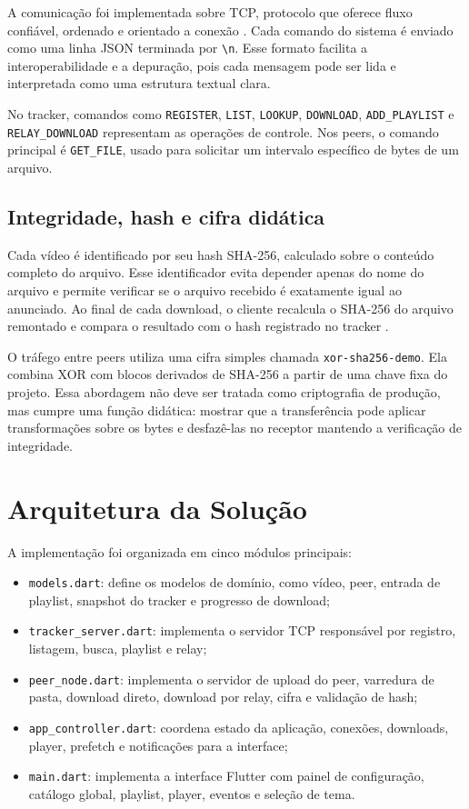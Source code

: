\documentclass[
	12pt,
	oneside,
	a4paper,
	chapter=TITLE,
	section=TITLE,
	english,
	brazilian,
	sumario=tradicional
]{abntex2}
\begin{document}
A comunicação foi implementada sobre TCP, protocolo que oferece fluxo confiável, ordenado e orientado a conexão \cite{rfc9293}. Cada comando do sistema é enviado como uma linha JSON terminada por \texttt{\textbackslash n}. Esse formato facilita a interoperabilidade e a depuração, pois cada mensagem pode ser lida e interpretada como uma estrutura textual clara.

No tracker, comandos como \texttt{REGISTER}, \texttt{LIST}, \texttt{LOOKUP}, \texttt{DOWNLOAD}, \texttt{ADD\_PLAYLIST} e \texttt{RELAY\_DOWNLOAD} representam as operações de controle. Nos peers, o comando principal é \texttt{GET\_FILE}, usado para solicitar um intervalo específico de bytes de um arquivo.

\subsection{Integridade, hash e cifra didática}

Cada vídeo é identificado por seu hash SHA-256, calculado sobre o conteúdo completo do arquivo. Esse identificador evita depender apenas do nome do arquivo e permite verificar se o arquivo recebido é exatamente igual ao anunciado. Ao final de cada download, o cliente recalcula o SHA-256 do arquivo remontado e compara o resultado com o hash registrado no tracker \cite{nist2015sha}.

O tráfego entre peers utiliza uma cifra simples chamada \texttt{xor-sha256-demo}. Ela combina XOR com blocos derivados de SHA-256 a partir de uma chave fixa do projeto. Essa abordagem não deve ser tratada como criptografia de produção, mas cumpre uma função didática: mostrar que a transferência pode aplicar transformações sobre os bytes e desfazê-las no receptor mantendo a verificação de integridade.

\section{Arquitetura da Solução}

A implementação foi organizada em cinco módulos principais:

\begin{itemize}
	\item \texttt{models.dart}: define os modelos de domínio, como vídeo, peer, entrada de playlist, snapshot do tracker e progresso de download;
	\item \texttt{tracker\_server.dart}: implementa o servidor TCP responsável por registro, listagem, busca, playlist e relay;
	\item \texttt{peer\_node.dart}: implementa o servidor de upload do peer, varredura de pasta, download direto, download por relay, cifra e validação de hash;
	\item \texttt{app\_controller.dart}: coordena estado da aplicação, conexões, downloads, player, prefetch e notificações para a interface;
	\item \texttt{main.dart}: implementa a interface Flutter com painel de configuração, catálogo global, playlist, player, eventos e seleção de tema.
\end{itemize}
\end{document}
